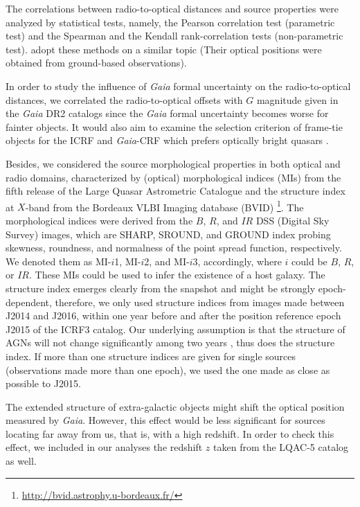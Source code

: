 \documentclass{aa}
\begin{document}
   The correlations between radio-to-optical distances and source properties were analyzed by statistical tests, namely, the Pearson correlation test (parametric test) and the Spearman and the Kendall rank-correlation tests (non-parametric test).
   \citet{2013MNRAS.430.2797A} adopt these methods on a similar topic (Their optical positions were obtained from ground-based observations).

   In order to study the influence of \textit{Gaia} formal uncertainty on the radio-to-optical distances, we correlated the radio-to-optical offsets with $G$ magnitude given in the {\it Gaia} DR2 catalogs since the \textit{Gaia} formal uncertainty becomes worse for fainter objects.
   It would also aim to examine the selection criterion of frame-tie objects for the ICRF and \textit{Gaia}-CRF which prefers optically bright quasars \citep[visual magnitude $V<18$, see, e.g.,][]{2008A&A...490..403B}.

   Besides, we considered the source morphological properties in both optical and radio domains, characterized by (optical) morphological indices (MIs) from the fifth release of the Large Quasar Astrometric Catalogue \citep[LQAC-5;][]{2019A&A...624A.145S} and the structure index \citep[SI;][]{1997ApJS..111...95F} at $X$-band from the Bordeaux VLBI Imaging database (BVID) \footnote{\url{http://bvid.astrophy.u-bordeaux.fr/}}.
   The morphological indices were derived from the $B$, $R$, and $IR$ DSS (Digital Sky Survey) images, which are SHARP, SROUND, and GROUND index probing skewness, roundness, and normalness of the point spread function, respectively.
   We denoted them as MI-$i$1, MI-$i$2, and MI-$i$3, accordingly, where $i$ could be $B$, $R$, or $IR$.
   These MIs could be used to infer the existence of a host galaxy.
   The structure index emerges clearly from the snapshot and might be strongly epoch-dependent, therefore, we only used structure indices from images made between J2014 and J2016, within one year before and after the position reference epoch J2015 of the ICRF3 catalog.
   Our underlying assumption is that the structure of AGNs will not change significantly among two years \citep[e.g., see][]{2016A&A...589A..71B}, thus does the structure index.
   If more than one structure indices are given for single sources (observations made more than one epoch), we used the one made as close as possible to J2015.

   The extended structure of extra-galactic objects might shift the optical position measured by \textit{Gaia}.
   However, this effect would be less significant for sources locating far away from us, that is, with a high redshift.
   In order to check this effect, we included in our analyses the redshift $z$ taken from the LQAC-5 catalog as well.
\end{document}
